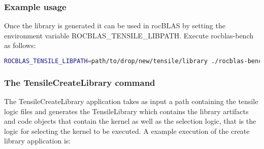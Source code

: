 \documentclass[]{article}
\begin{document}
\subsubsection{Example usage}

Once the library is generated it can be used in rocBLAS by setting the environment variable ROCBLAS\_TENSILE\_LIBPATH. Execute rocblas-bench as follows:

\begin{lstlisting}[language=bash]
ROCBLAS_TENSILE_LIBPATH=path/to/drop/new/tensile/library ./rocblas-bench --yaml problem_sizes.yaml
\end{lstlisting}

\subsubsection{The TensileCreateLibrary command}
The TensileCreateLibrary application takes as input a path containing the tensile logic files and generates the TensileLibrary which contains the library artifacts and code objects that contain the kernel as well as the selection logic, that is the logic for selecting the kernel to be executed. A example execution of the create library application is:
\end{document}

